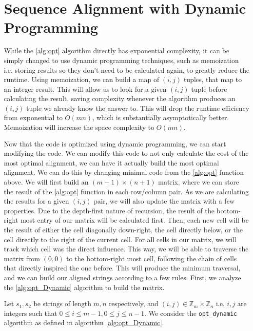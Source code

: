 \documentclass{article}
\renewcommand{\_}{\ifincsname_\else\legacyunderscore\fi}
\begin{document}
    \section*{Sequence Alignment with Dynamic Programming}

        While the \ref{alg:opt} algorithm directly has exponential complexity, it can be simply changed to use dynamic programming techniques, such as memoization i.e. storing results so they don't need to be calculated again, to greatly reduce the runtime. Using memoization, we can build a map of $(i, j)$ tuples, that map to an integer result. This will allow us to look for a given $(i, j)$ tuple before calculating the result, saving complexity whenever the algorithm produces an $(i, j)$ tuple we already know the answer to. This will drop the runtime efficiency from exponential to $O(mn)$, which is substantially asymptotically better. Memoization will increase the space complexity to $O(mn)$.

	    Now that the code is optimized using dynamic programming, we can start modifying the code. We can modify this code to not only calculate the cost of the most optimal alignment, we can have it actually build the most optimal alignment. We can do this by changing minimal code from the \ref{alg:opt} function above. We will first build an $(m+1)\times (n+1)$ matrix, where we can store the result of the \ref{alg:opt} function in each row/column pair. As we are calculating the results for a given $(i, j)$ pair, we will also update the matrix with a few properties. Due to the depth-first nature of recursion, the result of the bottom-right most entry of our matrix will be calculated first. Then, each new cell will be the result of either the cell diagonally down-right, the cell directly below, or the cell directly to the right of the current cell. For all cells in our matrix, we will track which cell was the direct influence. This way, we will be able to traverse the matrix from $(0, 0)$ to the bottom-right most cell, following the chain of cells that directly inspired the one before. This will produce the minimum traversal, and we can build our aligned strings according to a few rules. First, we analyze the \ref{alg:opt_Dynamic} algorithm to build the matrix. 

        Let $s_1, s_2$ be strings of length $m, n$ respectively, and $(i, j) \in \mathbb{Z}_m \times \mathbb{Z}_n$ i.e. $i, j$ are integers such that $0 \leq i \leq m - 1, 0 \leq j \leq n - 1$.  We consider the \texttt{opt\_dynamic} algorithm as defined in algorithm \ref{alg:opt_Dynamic}.
\end{document}
